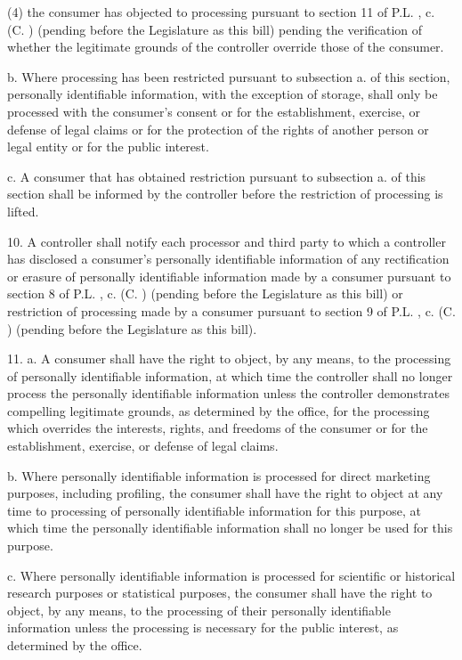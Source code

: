      (4)   the consumer has objected to processing pursuant to section 11 of P.L.    , c.    (C.      ) (pending before the Legislature as this bill) pending the verification of whether the legitimate grounds of the controller override those of the consumer.

     b.    Where processing has been restricted pursuant to subsection a. of this section, personally identifiable information, with the exception of storage, shall only be processed with the consumer's consent or for the establishment, exercise, or defense of legal claims or for the protection of the rights of another person or legal entity or for the public interest.

     c.     A consumer that has obtained restriction pursuant to subsection a. of this section shall be informed by the controller before the restriction of processing is lifted.

 

     10.  A controller shall notify each processor and third party to which a controller has disclosed a consumer's personally identifiable information of any rectification or erasure of personally identifiable information made by a consumer pursuant to section 8 of P.L.    , c.    (C.      ) (pending before the Legislature as this bill) or restriction of processing made by a consumer pursuant to section 9 of P.L.    , c.    (C.      ) (pending before the Legislature as this bill).

 

     11.  a.  A consumer shall have the right to object, by any means, to the processing of personally identifiable information, at which time the controller shall no longer process the personally identifiable information unless the controller demonstrates compelling legitimate grounds, as determined by the office, for the processing which overrides the interests, rights, and freedoms of the consumer or for the establishment, exercise, or defense of legal claims.

     b.    Where personally identifiable information is processed for direct marketing purposes, including profiling, the consumer shall have the right to object at any time to processing of personally identifiable information for this purpose, at which time the personally identifiable information shall no longer be used for this purpose.

     c.     Where personally identifiable information is processed for scientific or historical research purposes or statistical purposes, the consumer shall have the right to object, by any means, to the processing of their personally identifiable information unless the processing is necessary for the public interest, as determined by the office.

